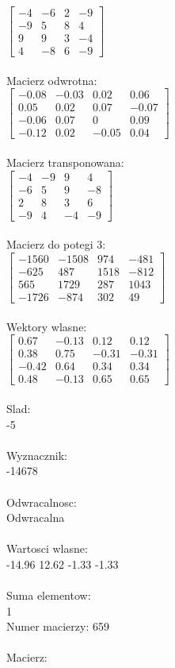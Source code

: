\documentclass[a4paper,12pt]{article}
\begin{document}
$\begin{bmatrix} -4&-6&2&-9\\-9&5&8&4\\9&9&3&-4\\4&-8&6&-9 \end{bmatrix}$
\\
\\
Macierz odwrotna:\\

$\begin{bmatrix} -0.08&-0.03&0.02&0.06\\0.05&0.02&0.07&-0.07\\-0.06&0.07&0&0.09\\-0.12&0.02&-0.05&0.04 \end{bmatrix}$
\\
\\
Macierz transponowana:\\

$\begin{bmatrix} -4&-9&9&4\\-6&5&9&-8\\2&8&3&6\\-9&4&-4&-9 \end{bmatrix}$
\\
\\
Macierz do potegi 3:\\

$\begin{bmatrix} -1560&-1508&974&-481\\-625&487&1518&-812\\565&1729&287&1043\\-1726&-874&302&49 \end{bmatrix}$
\\
\\
Wektory wlasne:\\

$\begin{bmatrix} 0.67&-0.13&0.12&0.12\\0.38&0.75&-0.31&-0.31\\-0.42&0.64&0.34&0.34\\0.48&-0.13&0.65&0.65 \end{bmatrix}$
\\
\\
Slad:\\
-5
\\
\\
Wyznacznik:\\
-14678
\\
\\
Odwracalnosc:\\
Odwracalna
\\
\\
Wartosci wlasne:\\
-14.96 12.62 -1.33 -1.33
\\
\\
Suma elementow:\\
1
\\
\newpage
Numer macierzy:
659
\\
\\
Macierz:\\
\end{document}
